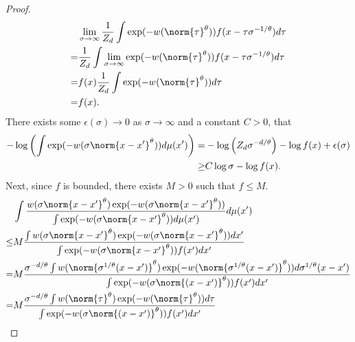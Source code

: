 \begin{proof}
    \begin{align}
          & \lim_{\sigma \to \infty} \frac{1}{Z_d} \int \exp(-w(\norm{\tau}^{\theta})) f(x-\tau \sigma^{-1/\theta}) d\tau \nonumber \\
        = & \frac{1}{Z_d} \int \lim_{\sigma \to \infty} \exp(-w(\norm{\tau}^{\theta})) f(x-\tau \sigma^{-1/\theta}) d\tau \nonumber \\
        = & f(x) \frac{1}{Z_d} \int \exp(-w(\norm{\tau}^{\theta})) d\tau \nonumber                                                  \\
        = & f(x).
    \end{align}
    There exists some $\epsilon(\sigma) \to 0$ as $\sigma\to \infty$ and a constant $C>0$, that
    \begin{align} \label{big_f_lowerbound_1}
        -\log \left(\int \exp(-w(\sigma\norm{x-x'}^{\theta}))d\mu(x')\right) = & -\log\left(Z_d \sigma^{-d/\theta}\right) - \log f(x)+ \epsilon(\sigma) \nonumber \\
        \geq                                                                   & C\log \sigma - \log f(x).
    \end{align}
    Next, since $f$ is bounded, there exists $M>0$ such that $f \leq M$.
    \begin{align} \label{big_F_lowerbound_2}
             & \int \frac{w(\sigma\norm{x-x'}^{\theta})\exp(-w(\sigma\norm{x-x'}^{\theta}))}{\int \exp(-w(\sigma\norm{x-x'}^{\theta})) d\mu(x')} d\mu(x') \nonumber                                                                  \\
        \leq & M \frac{\int w(\sigma\norm{x-x'}^{\theta})\exp(-w(\sigma\norm{x-x'}^{\theta}))dx'}{\int \exp(-w(\sigma\norm{x-x'}^{\theta}))f(x') dx'} \nonumber                                                                      \\
        =    & M \frac{\sigma^{-d/\theta}\int w(\norm{\sigma^{1/\theta}(x-x')}^{\theta})\exp(-w(\norm{\sigma^{1/\theta}(x-x')}^{\theta}))d\sigma^{1/\theta}(x-x')}{ \int \exp(-w(\sigma \norm{(x-x')}^{\theta}))f(x') dx'} \nonumber \\
        =    & M \frac{\sigma^{-d/\theta}\int w(\norm{\tau}^{\theta})\exp(-w(\norm{\tau}^{\theta}))d\tau}{ \int \exp(-w(\sigma \norm{(x-x')}^{\theta}))f(x') dx'} \nonumber                                                          \\

\end{align}
\end{proof}
